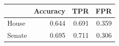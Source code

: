 
\begin{tabular}{lrrr}
\toprule
  & Accuracy & TPR & FPR\\
\midrule
House & 0.644 & 0.691 & 0.359\\
Senate & 0.695 & 0.711 & 0.306\\
\bottomrule
\end{tabular}
